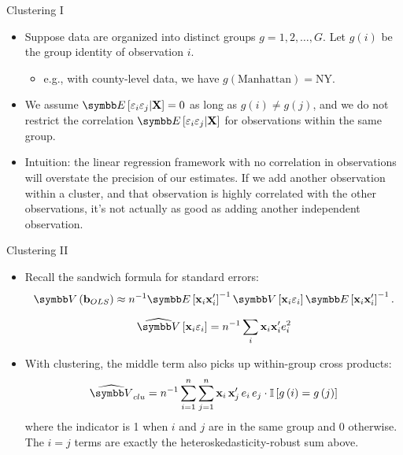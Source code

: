 \documentclass[aspectratio=169,11pt]{beamer}
\begin{document}
\begin{frame}{Clustering I}
\begin{itemize}
	\item Suppose data are organized into distinct groups $g=1,2,\dots,G$. Let $g\left(i\right)$
	be the group identity of observation $i$. 
	\begin{itemize}
		\item e.g., with county-level data, we have $g\left(\text{Manhattan}\right)=\text{NY}$.
	\end{itemize}


	\medskip
	\item We assume $\E\left[\varepsilon_i \varepsilon_j | {\bf X}\right]=0$ as long as $g\left(i\right)\ne g\left(j\right)$,
	and we do not restrict the correlation $\E\left[\varepsilon_i \varepsilon_j | {\bf X}\right]$
	for observations within the same group.

	\medskip
	\item Intuition: the linear regression framework with no correlation in observations will overstate
	the precision of our estimates. If we add another observation within a cluster, and that observation
	is highly correlated with the other observations, it's not actually as good as adding another independent observation. 
\end{itemize}
\end{frame}

\begin{frame}{Clustering II}
\begin{itemize}
	\item Recall the sandwich formula for standard errors:
		\begin{align*}
		\Var\left({\bf b}_{OLS}\right) \approx	n^{-1} \E\left[{\bf x}_i {\bf x}_i' \right]^{-1} \Var \left[{\bf x}_i \varepsilon_i \right] \E\left[{\bf x}_i {\bf x}_i' \right]^{-1}.
		\end{align*}

		\begin{align*}
		\widehat{\Var}\left[{\bf x}_i \varepsilon_i \right] = n^{-1} \sum_{i} {\bf x}_i {\bf x}_i'  e_i^2
		\end{align*}

	\item With clustering, the middle term also picks up within-group cross products:\[
	\widehat{\Var}_{clu} = n^{-1} \sum_{i=1}^{n}\sum_{j=1}^{n} {\bf x}_i\,  {\bf x}'_j \, e_i\, e_j \cdot \mathbb{I}\left[g\left(i\right)=g\left(j\right)\right]
	\]
	where the indicator is 1 when $i$ and $j$ are in the same group and 0 otherwise.
	The $i=j$ terms are exactly the heteroskedasticity-robust sum above.

\end{itemize}
\end{frame}
\end{document}
